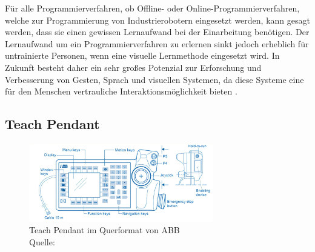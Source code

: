 Für alle Programmierverfahren, ob Offline- oder Online-Programmierverfahren, welche zur Programmierung von Industrierobotern eingesetzt werden, kann gesagt werden, dass sie einen gewissen Lernaufwand bei der Einarbeitung benötigen. Der Lernaufwand um ein Programmierverfahren zu erlernen sinkt jedoch erheblich für untrainierte Personen, wenn eine visuelle Lernmethode eingesetzt wird. In Zukunft besteht daher ein sehr großes Potenzial zur Erforschung und Verbesserung von Gesten, Sprach und visuellen Systemen, da diese Systeme eine für den Menschen vertrauliche Interaktionsmöglichkeit bieten \cite{biggs_survey_nodate}.\clearpage

\subsection{Teach Pendant}
\begin{figure}[htb]
	\centering
	\includegraphics[width=0.715\textwidth]{images/stand_der_technik/teach_pendant}
	\caption[Teach Pendant im Querformat von ABB]{Teach Pendant im Querformat von ABB \\Quelle: \cite{noauthor_programengif_nodate}}
	\label{fig:teach_pendant}
\end{figure}
\FloatBarrier


